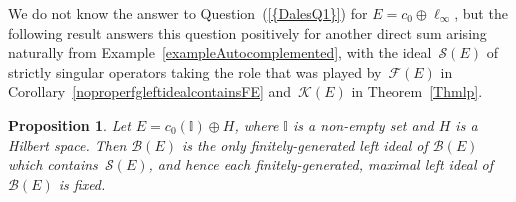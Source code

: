 \documentclass[12pt]{amsart}
\newtheorem{proposition}[theorem]{Proposition}
\theoremstyle{definition}
\numberwithin{equation}{section}
\begin{document}
We do not know the answer to Question~{{\normalfont\textrm{(\ref{{DalesQ1}})}}} for $E =
c_0\oplus\ell_\infty$, but the following result answers this question
positively for another direct sum arising naturally from
Example~\ref{exampleAutocomplemented}, with the ideal~$\mathscr{S}(E)$
of strictly singular operators taking the role that was played
by~$\mathscr{F}(E)$ in Corollary~\ref{noproperfgleftidealcontainsFE}
and~$\mathscr{K}(E)$ in Theorem~\ref{Thmlp}.

\begin{proposition}\label{c0plusHilbert}
  Let $E = c_0(\mathbb{I})\oplus H$, where $\mathbb{I}$ is a non-empty
  set and $H$ is a Hilbert space.  Then $\mathscr{B}(E)$ is the only
  finitely-generated left ideal of $\mathscr{B}(E)$ which
  contains~$\mathscr{S}(E)$, and hence each finitely-generated,
  maximal left ideal of~$\mathscr{B}(E)$ is fixed.
\end{proposition}
\end{document}
